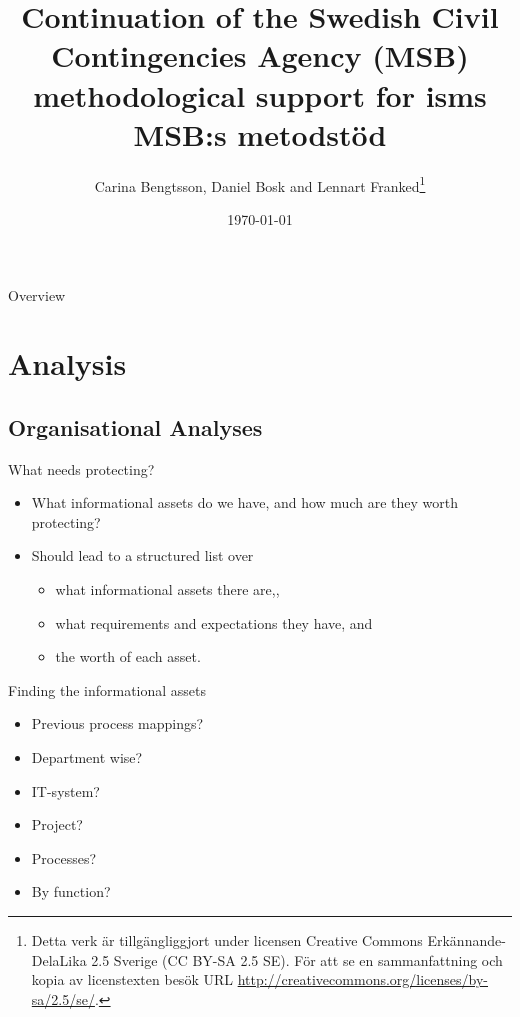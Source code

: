 \documentclass{beamer}
\title[Introduction Information Security]{%
  Continuation of the Swedish Civil Contingencies Agency (MSB) 
  methodological support for \ac{isms}\\
  MSB:s metodstöd
}
\author{Carina Bengtsson, Daniel Bosk and Lennart Franked\footnote{%
  Detta verk är tillgängliggjort under licensen Creative Commons 
  Erkännande-DelaLika 2.5 Sverige (CC BY-SA 2.5 SE).
	För att se en sammanfattning och kopia av licenstexten besök URL 
	\url{http://creativecommons.org/licenses/by-sa/2.5/se/}.
}}
\institute[MIUN ITM]{%
  Department of Informationsystems and Technologies\\
  Mid Sweden University,
  Sundsvall.
}
\date{\today}
\begin{document}
\begin{frame}
  \titlepage{}
\end{frame}

\begin{frame}{Overview}
  \begin{multicols}{2}
    \tableofcontents
  \end{multicols}
\end{frame}




\section{Analysis}

\subsection{Organisational Analyses}

\begin{frame}{What needs protecting?}
  \begin{itemize}
    \item What informational assets do we have, and how much are they worth
      protecting?
    \item Should lead to a structured list over
      \begin{itemize}
        \item what informational assets there are,,
        \item what requirements and expectations they have, and
        \item the worth of each asset.
      \end{itemize}
  \end{itemize}
\end{frame}

\begin{frame}{Finding the informational assets}
  \begin{itemize}
    \item Previous process mappings?
    \item Department wise?
    \item IT-system?
    \item Project?
    \item Processes?
    \item By function?
  \end{itemize}
\end{frame}
\end{document}
